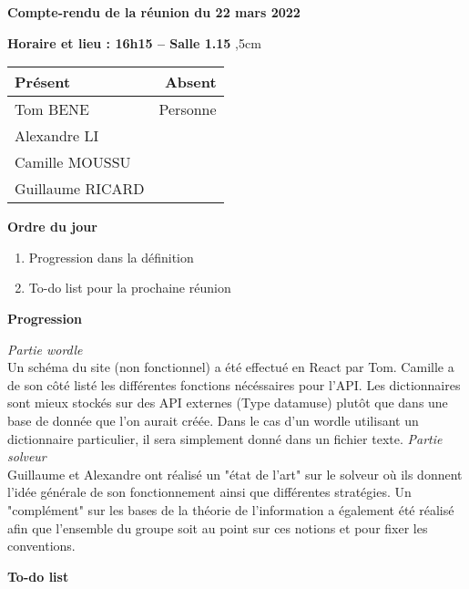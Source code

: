 \documentclass[12pt,a4paper,final]{report}
\begin{document}
\begin{center}
\Large \textbf{Compte-rendu de la réunion du 22 mars 2022}
\end{center}

\textbf{Horaire et lieu : 16h15 -- Salle 1.15}
,5cm

\begin{center}
\begin{tabular}{|l|r|}
    \hline
    Présent & Absent \\
    \hline
    Tom BENE & Personne \\
    Alexandre LI & \\
    Camille MOUSSU& \\
    Guillaume RICARD & \\
    \hline
\end{tabular}
\end{center}

\begin{flushleft}
    \textbf{Ordre du jour}
\end{flushleft}

\begin{enumerate}
    \item Progression dans la définition
    \item To-do list pour la prochaine réunion
\end{enumerate}


\begin{flushleft}
    \textbf{Progression}
\end{flushleft}

\textit{Partie wordle } \\ 
Un schéma du site (non fonctionnel) a été effectué en React par Tom. Camille a de son côté listé les différentes fonctions nécéssaires pour l'API. Les dictionnaires sont mieux stockés sur des API externes (Type datamuse) plutôt que dans une base de donnée que l'on aurait créée. Dans le cas d'un wordle utilisant un dictionnaire particulier, il sera simplement donné dans un fichier texte. 
\vskip 0.25cm
\textit{Partie solveur } \\ 
Guillaume et Alexandre ont réalisé un "état de l'art" sur le solveur où ils donnent l'idée générale de son fonctionnement ainsi que différentes stratégies. Un "complément" sur les bases de la théorie de l'information a également été réalisé afin que l'ensemble du groupe soit au point sur ces notions et pour fixer les conventions. 


\begin{flushleft}
    \textbf{To-do list}
\end{flushleft}
\end{document}
